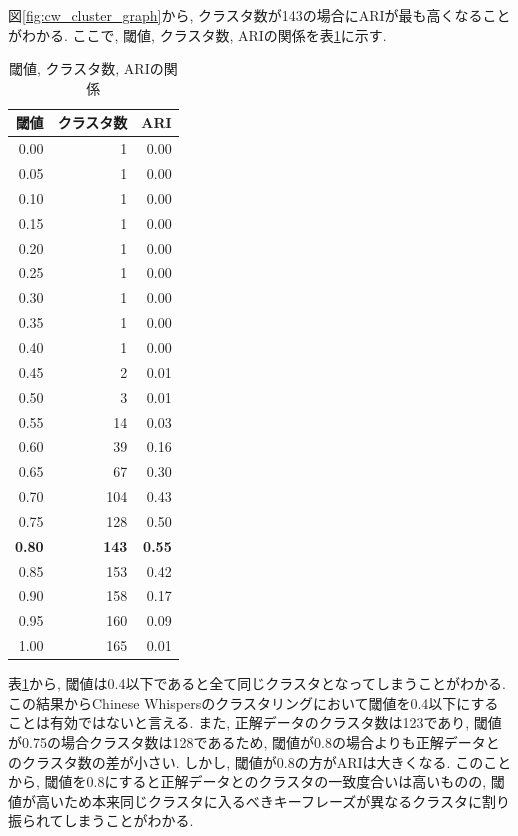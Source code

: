 図\ref{fig:cw_cluster_graph}から, クラスタ数が143の場合にARIが最も高くなることがわかる. 
ここで, 閾値, クラスタ数, ARIの関係を表\ref{tb:cw_result}に示す. 

\begin{table}[H]
  \caption{閾値, クラスタ数, ARIの関係}
  \label{tb:cw_result}
  \begin{center}
  \begin{tabular}{r|r|r}
    \hline
    閾値&クラスタ数&ARI\\\hline\hline
    0.00&1&0.00\\\hline
    0.05&1&0.00\\\hline
    0.10&1&0.00\\\hline
    0.15&1&0.00\\\hline
    0.20&1&0.00\\\hline
    0.25&1&0.00\\\hline
    0.30&1&0.00\\\hline
    0.35&1&0.00\\\hline
    0.40&1&0.00\\\hline
    0.45&2&0.01\\\hline
    0.50&3&0.01\\\hline
    0.55&14&0.03\\\hline
    0.60&39&0.16\\\hline
    0.65&67&0.30\\\hline
    0.70&104&0.43\\\hline
    0.75&128&0.50\\\hline
    \textbf{0.80}&\textbf{143}&\textbf{0.55}\\\hline
    0.85&153&0.42\\\hline
    0.90&158&0.17\\\hline
    0.95&160&0.09\\\hline
    1.00&165&0.01\\\hline
  \end{tabular}\end{center}
\end{table}

表\ref{tb:cw_result}から, 閾値は0.4以下であると全て同じクラスタとなってしまうことがわかる. この結果からChinese Whispersのクラスタリングにおいて閾値を0.4以下にすることは有効ではないと言える.  
また, 正解データのクラスタ数は123であり, 閾値が0.75の場合クラスタ数は128であるため, 閾値が0.8の場合よりも正解データとのクラスタ数の差が小さい. しかし, 閾値が0.8の方がARIは大きくなる. 
このことから, 閾値を0.8にすると正解データとのクラスタの一致度合いは高いものの, 閾値が高いため本来同じクラスタに入るべきキーフレーズが異なるクラスタに割り振られてしまうことがわかる. 


